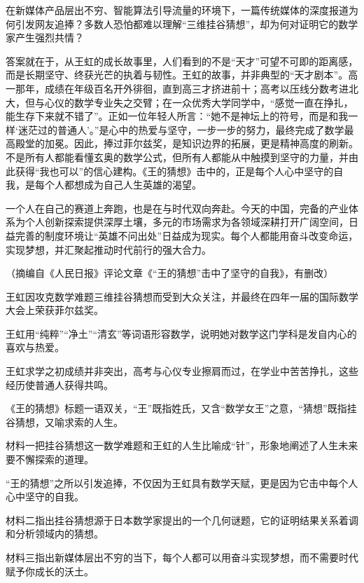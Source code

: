 \documentclass[11pt,a4paper]{ctexart}
\begin{document}
\begin{materialtext}
在新媒体产品层出不穷、智能算法引导流量的环境下，一篇传统媒体的深度报道为何引发网友追捧？多数人恐怕都难以理解“三维挂谷猜想”，却为何对证明它的数学家产生强烈共情？

答案就在于，从王虹的成长故事里，人们看到的不是“天才”可望不可即的距离感，而是长期坚守、终获光芒的执着与韧性。王虹的故事，并非典型的“天才剧本”。高一那年，成绩在年级百名开外徘徊，直到高三才挤进前十；高考以压线分数考进北大，但与心仪的数学专业失之交臂；在一众优秀大学同学中，“感觉一直在挣扎，能生存下来就不错了”。正如一位年轻人所言：“她不是神坛上的符号，而是和我一样‘迷茫过的普通人’。”是心中的热爱与坚守，一步一步的努力，最终完成了数学最高殿堂的加冕。因此，捧过菲尔兹奖，是知识边界的拓展，更是精神高度的刷新。不是所有人都能看懂玄奥的数学公式，但所有人都能从中触摸到坚守的力量，并由此获得“我也可以”的信心建构。《王的猜想》击中的，正是每个人心中坚守的自我，是每个人都想成为自己人生英雄的渴望。

一个人在自己的赛道上奔跑，也是在与时代双向奔赴。今天的中国，完备的产业体系为个人创新探索提供深厚土壤，多元的市场需求为各领域深耕打开广阔空间，日益完善的制度环境让“英雄不问出处”日益成为现实。每个人都能用奋斗改变命运，实现梦想，并汇聚起推动时代前行的强大合力。
\end{materialtext}
\begin{flushright}（摘编自《人民日报》评论文章《“王的猜想”击中了坚守的自我》，有删改）\end{flushright}

\begin{choices}
\item 王虹因攻克数学难题三维挂谷猜想而受到大众关注，并最终在四年一届的国际数学大会上荣获菲尔兹奖。
\item 王虹用“纯粹”“净土”“清玄”等词语形容数学，说明她对数学这门学科是发自内心的喜欢与热爱。
\item 王虹求学之初成绩并非突出，高考与心仪专业擦肩而过，在学业中苦苦挣扎，这些经历使普通人获得共鸣。
\item 《王的猜想》标题一语双关，“王”既指姓氏，又含“数学女王”之意，“猜想”既指挂谷猜想，又喻求索的人生。
\end{choices}

\begin{choices}
\item 材料一把挂谷猜想这一数学难题和王虹的人生比喻成“针”，形象地阐述了人生未来要不懈探索的道理。
\item “王的猜想”之所以引发追捧，不仅因为王虹具有数学天赋，更是因为它击中每个人心中坚守的自我。
\item 材料二指出挂谷猜想源于日本数学家提出的一个几何谜题，它的证明结果关系着调和分析领域内的猜想。
\item 材料三指出新媒体层出不穷的当下，每个人都可以用奋斗实现梦想，而不需要时代赋予你成长的沃土。
\end{choices}
\end{document}
